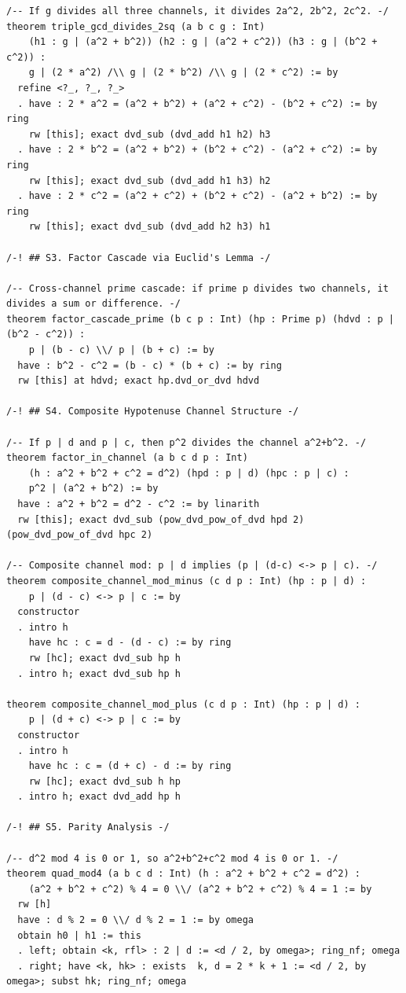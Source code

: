 \documentclass[11pt,openright,twoside]{book}
\theoremstyle{definition}
\begin{document}
\begin{lstlisting}[style=lean]
/-- If g divides all three channels, it divides 2a^2, 2b^2, 2c^2. -/
theorem triple_gcd_divides_2sq (a b c g : Int)
    (h1 : g | (a^2 + b^2)) (h2 : g | (a^2 + c^2)) (h3 : g | (b^2 + c^2)) :
    g | (2 * a^2) /\\ g | (2 * b^2) /\\ g | (2 * c^2) := by
  refine <?_, ?_, ?_>
  . have : 2 * a^2 = (a^2 + b^2) + (a^2 + c^2) - (b^2 + c^2) := by ring
    rw [this]; exact dvd_sub (dvd_add h1 h2) h3
  . have : 2 * b^2 = (a^2 + b^2) + (b^2 + c^2) - (a^2 + c^2) := by ring
    rw [this]; exact dvd_sub (dvd_add h1 h3) h2
  . have : 2 * c^2 = (a^2 + c^2) + (b^2 + c^2) - (a^2 + b^2) := by ring
    rw [this]; exact dvd_sub (dvd_add h2 h3) h1

/-! ## S3. Factor Cascade via Euclid's Lemma -/

/-- Cross-channel prime cascade: if prime p divides two channels, it divides a sum or difference. -/
theorem factor_cascade_prime (b c p : Int) (hp : Prime p) (hdvd : p | (b^2 - c^2)) :
    p | (b - c) \\/ p | (b + c) := by
  have : b^2 - c^2 = (b - c) * (b + c) := by ring
  rw [this] at hdvd; exact hp.dvd_or_dvd hdvd

/-! ## S4. Composite Hypotenuse Channel Structure -/

/-- If p | d and p | c, then p^2 divides the channel a^2+b^2. -/
theorem factor_in_channel (a b c d p : Int)
    (h : a^2 + b^2 + c^2 = d^2) (hpd : p | d) (hpc : p | c) :
    p^2 | (a^2 + b^2) := by
  have : a^2 + b^2 = d^2 - c^2 := by linarith
  rw [this]; exact dvd_sub (pow_dvd_pow_of_dvd hpd 2) (pow_dvd_pow_of_dvd hpc 2)

/-- Composite channel mod: p | d implies (p | (d-c) <-> p | c). -/
theorem composite_channel_mod_minus (c d p : Int) (hp : p | d) :
    p | (d - c) <-> p | c := by
  constructor
  . intro h
    have hc : c = d - (d - c) := by ring
    rw [hc]; exact dvd_sub hp h
  . intro h; exact dvd_sub hp h

theorem composite_channel_mod_plus (c d p : Int) (hp : p | d) :
    p | (d + c) <-> p | c := by
  constructor
  . intro h
    have hc : c = (d + c) - d := by ring
    rw [hc]; exact dvd_sub h hp
  . intro h; exact dvd_add hp h

/-! ## S5. Parity Analysis -/

/-- d^2 mod 4 is 0 or 1, so a^2+b^2+c^2 mod 4 is 0 or 1. -/
theorem quad_mod4 (a b c d : Int) (h : a^2 + b^2 + c^2 = d^2) :
    (a^2 + b^2 + c^2) % 4 = 0 \\/ (a^2 + b^2 + c^2) % 4 = 1 := by
  rw [h]
  have : d % 2 = 0 \\/ d % 2 = 1 := by omega
  obtain h0 | h1 := this
  . left; obtain <k, rfl> : 2 | d := <d / 2, by omega>; ring_nf; omega
  . right; have <k, hk> : exists  k, d = 2 * k + 1 := <d / 2, by omega>; subst hk; ring_nf; omega


\end{lstlisting}
\end{document}

